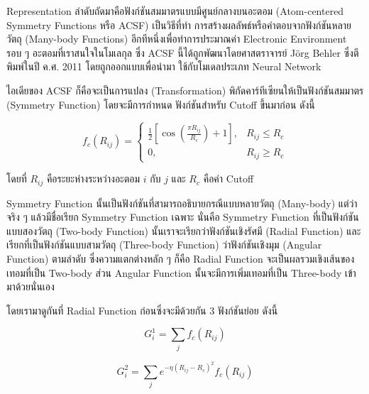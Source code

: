 Representation ลำดับถัดมาคือฟังก์ชันสมมาตรแบบมีศูนย์กลางบนอะตอม (Atom-centered Symmetry Functions หรือ ACSF) เป็นวิธีที่ทำ%
การสร้างผลลัพธ์หรือคำตอบจากฟังก์ชันหลายวัตถุ (Many-body Functions) อีกทีหนึ่งเพื่อทำการประมาณค่า Electronic Environment รอบ ๆ 
อะตอมที่เราสนใจในโมเลกุล ซึ่ง ACSF นี้ได้ถูกพัฒนาโดยศาสตราจารย์ J\"{o}rg Behler ซึ่งตีพิมพ์ในปี ค.ศ. 2011 โดยถูกออกแบบเพื่อนำมา%
ใช้กับโมเดลประเภท Neural Network \autocite{behler2011a}

ไอเดียของ ACSF ก็คือจะเป็นการแปลง (Transformation) พิกัดคาร์ทีเซียนให้เป็นฟังก์ชันสมมาตร (Symmetry Function) โดยจะมีการกำหนด%
ฟังก์ชันสำหรับ Cutoff ขึ้นมาก่อน ดังนี้

\begin{equation}\label{eq:acsf_cutoff}
    f_{c}(R_{ij}) = 
    \begin{cases}
        \frac{1}{2} \left[\cos(\frac{\textstyle \pi R_{ij}}{\textstyle R_{c}}) + 1 \right], & R_{ij} \le R_{c} \\
        0, & R_{ij} \ge R_{c}
    \end{cases}
\end{equation}

\noindent โดยที่ $R_{ij}$ คือระยะห่างระหว่างอะตอม $i$ กับ $j$ และ $R_{c}$ คือค่า Cutoff

Symmetry Function นั้นเป็นฟังก์ชันที่สามารถอธิบายกรณีแบบหลายวัตถุ (Many-body) แต่ว่าจริง ๆ แล้วมีชื่อเรียก Symmetry Function เฉพาะ 
นั่นคือ Symmetry Function ที่เป็นฟังก์ชันแบบสองวัตถุ (Two-body Function) นั้นเราจะเรียกว่าฟังก์ชันเชิงรัศมี (Radial Function) 
และเรียกที่เป็นฟังก์ชันแบบสามวัตถุ (Three-body Function) ว่าฟังก์ชันเชิงมุม (Angular Function) ตามลำดับ ซึ่งความแตกต่างหลัก ๆ 
ก็คือ Radial Function จะเป็นผลรวมเชิงเส้นของเทอมที่เป็น Two-body ส่วน Angular Function นั้นจะมีการเพิ่มเทอมที่เป็น Three-body 
เข้ามาด้วยนั่นเอง

โดยเรามาดูกันที่ Radial Function ก่อนซึ่งจะมีด้วยกัน 3 ฟังก์ชันย่อย ดังนี้

\begin{equation}\label{eq:rf_g1}
    G^{1}_{i} = \sum_{j} f_{c}(R_{ij})
\end{equation}

\begin{equation}\label{eq:rf_g2}
    G^{2}_{i} = \sum_{j} e^{-\eta(R_{ij} - R_{s})^{2}} f_{c}(R_{ij})
\end{equation}

